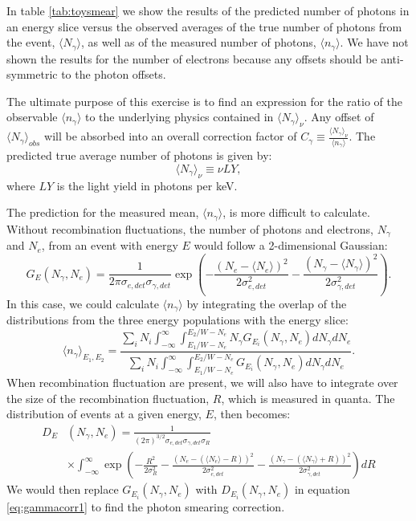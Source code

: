 In table \ref{tab:toysmear} we show the results of the predicted number of photons in an energy slice versus the observed averages of the true number of photons from the event, $\langle N_{\gamma} \rangle$, as well as of the measured number of photons, $\langle n_{\gamma} \rangle$. We have not shown the results for the number of electrons because any offsets should be anti-symmetric to the photon offsets. 

The ultimate purpose of this exercise is to find an expression for the ratio of the observable $\langle n_{\gamma} \rangle$ to the underlying physics contained in $\langle N_{\gamma} \rangle_{\nu}$. Any offset of $\langle N_{\gamma} \rangle_{obs}$ will be absorbed into an overall correction factor of $C_{\gamma}\equiv \frac{\langle N_{\gamma} \rangle_{\nu}}{\langle n_{\gamma} \rangle}$. The predicted true average  number of photons is given by:
\begin{equation}
\langle N_{\gamma} \rangle_{\nu} \equiv \nu LY,
\end{equation}
where $LY$ is the light yield in photons per keV. 

The prediction for the measured mean, $\langle n_{\gamma} \rangle$, is more difficult to calculate. Without recombination fluctuations, the number of photons and electrons, $N_{\gamma}$ and $N_e$, from an event with energy $E$ would follow a 2-dimensional Gaussian:
\begin{equation}\label{eq:2dgaus}
G_{E}(N_{\gamma},N_{e})=\frac{1}{2\pi \sigma_{e,det} \sigma_{\gamma,det}}\exp \left(-\frac{(N_e- \langle N_{e} \rangle)^2}{2\sigma_{e,det}^2}-\frac{(N_{\gamma}- \langle N_{\gamma} \rangle)^2}{2\sigma_{\gamma,det}^2}\right).
\end{equation}
In this case, we could calculate $\langle n_{\gamma} \rangle$ by integrating the overlap of the distributions from the three energy populations with the energy slice:
\begin{equation}\label{eq:gammacorr1}
\langle n_{\gamma} \rangle_{E_1,E_2}=\frac{\sum_i N_i \int_{-\infty}^{\infty} \int_{E_1/W-N_e}^{E_2/W-N_e} N_{\gamma} G_{E_i}(N_{\gamma},N_{e})dN_{\gamma}dN_{e}}{\sum_i N_i \int_{-\infty}^{\infty} \int_{E_1/W-N_e}^{E_2/W-N_e} G_{E_i}(N_{\gamma},N_{e})dN_{\gamma}dN_{e}}.
\end{equation}
When recombination fluctuation are present, we will also have to integrate over the size of the recombination fluctuation, $R$, which is measured in quanta. The distribution of events at a given energy, $E$, then becomes:
\begin{equation}\label{eq:resdist}
\begin{split}
D_E&(N_{\gamma},N_{e})=\frac{1}{(2\pi)^{3/2} \sigma_{e,det}\sigma_{\gamma,det}\sigma_R} \\
& \times \int_{-\infty}^{\infty}\exp\left(-\frac{R^2}{2\sigma_R^2}-\frac{(N_e- (\langle N_{e} \rangle-R))^2}{2\sigma_{e,det}^2}-\frac{(N_{\gamma}- (\langle N_{\gamma} \rangle+R))^2}{2\sigma_{\gamma,det}^2}\right)dR
\end{split}
\end{equation}
We would then replace $G_{E_i}(N_{\gamma},N_{e})$ with $D_{E_i}(N_{\gamma},N_{e})$ in equation \ref{eq:gammacorr1} to find the photon smearing correction.

